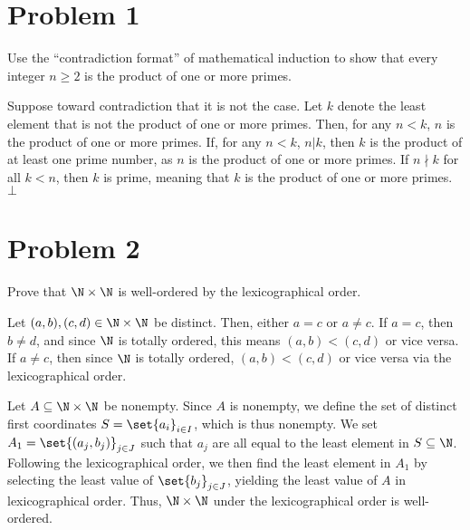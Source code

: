 \documentclass[10pt]{mypackage}
\begin{document}
\RaggedRight
\section{Problem 1}%
\begin{problem}
  Use the ``contradiction format'' of mathematical induction to show that every integer $n\geq 2$ is the product of one or more primes.
\end{problem}
\begin{solution}
  Suppose toward contradiction that it is not the case. Let $k$ denote the least element that is not the product of one or more primes. Then, for any $n < k$, $n$ is the product of one or more primes. If, for any $n < k$, $n | k$, then $k$ is the product of at least one prime number, as $n$ is the product of one or more primes. If $n \nmid k$ for all $k < n$, then $k$ is prime, meaning that $k$ is the product of one or more primes. $\bot$
\end{solution}
\section{Problem 2}%
\begin{problem}
  Prove that $\N\times \N$ is well-ordered by the lexicographical order.
\end{problem}
\begin{solution}
  Let $(a,b),(c,d)\in \N\times\N$ be distinct. Then, either $a = c$ or $a\neq c$. If $a = c$, then $b\neq d$, and since $\N$ is totally ordered, this means $(a,b) < (c,d)$ or vice versa. If $a \neq c$, then since $\N$ is totally ordered, $(a,b) < (c,d)$ or vice versa via the lexicographical order.\newline

  Let $A\subseteq \N\times \N$ be nonempty. Since $A$ is nonempty, we define the set of distinct first coordinates $S = \set{a_i}_{i\in I}$, which is thus nonempty. We set $A_1 = \set{\left(a_j,b_j\right)}_{j\in J}$ such that $a_j$ are all equal to the least element in $S\subseteq \N$. Following the lexicographical order, we then find the least element in $A_1$ by selecting the least value of $\set{b_j}_{j\in J}$, yielding the least value of $A$ in lexicographical order. Thus, $\N\times \N$ under the lexicographical order is well-ordered.
\end{solution}
\end{document}
